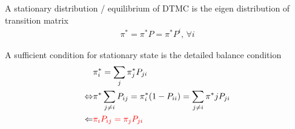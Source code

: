         A stationary distribution / equilibrium of DTMC is the eigen distribution of transition matrix
        \begin{align}
            \pi^*=\pi^*P=\pi^*P^i,\,\forall i 
        \end{align}
        
        A sufficient condition for stationary state is the detailed balance condition
        \begin{align}
            &\pi^*_i=\sum_{j}\pi^*_jP_{ji}\\
            \Leftrightarrow&\pi^*\sum_{j\neq i}P_{ij}=\pi^*_i(1-P_{ii})=\sum_{j\neq i}\pi^*jP_{ji}\\
            \Leftarrow&\color{red}\pi_iP_{ij}=\pi_jP_{ji}
        \end{align}

